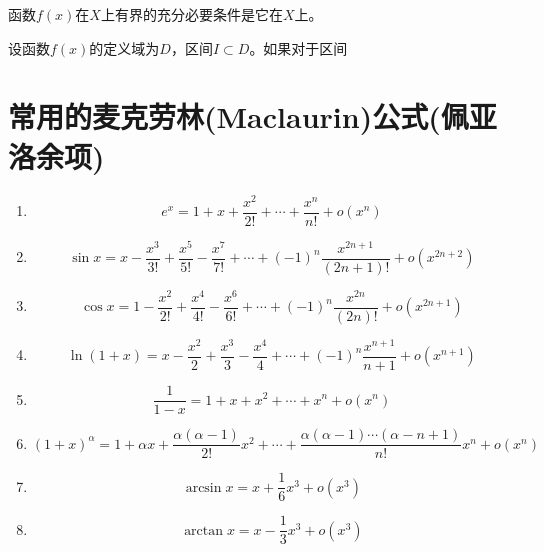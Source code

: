 \documentclass[lang=cn,10pt]{elegantbook}
\begin{document}
\begin{note}
	函数\( f(x) \)在\( X \)上有界的{\heiti 充分必要条件}是它在\( X \)上。
\end{note}

\begin{definition}[函数的单调性]
	设函数\( f(x) \)的定义域为\( D \)，区间\( I \subset D \)。如果对于区间
\end{definition}

\appendix
\renewcommand{\thechapter}{\Roman{chapter}}%
\chapter{常用的麦克劳林(Maclaurin)公式(佩亚洛余项)}
\begin{enumerate}
	\item \[ e^{x} = 1 + x + \dfrac{x^{2}}{2!} + \cdots + \dfrac{x^{n}}{n!} + o(x^{n}) \]
	\item \[ \sin x = x - \dfrac{x^{3}}{3!} + \dfrac{x^{5}}{5!} - \dfrac{x^{7}}{7!} + \cdots + (-1)^{n}\dfrac{x^{2n + 1}}{(2n + 1)!} + o(x^{2n + 2}) \]
	\item \[ \cos x = 1 - \dfrac{x^{2}}{2!} + \dfrac{x^{4}}{4!} - \dfrac{x^{6}}{6!} + \cdots + (-1)^{n}\dfrac{x^{2n}}{(2n)!} + o(x^{2n + 1}) \]
	\item \[ \ln(1 + x) = x - \dfrac{x^{2}}{2} + \dfrac{x^{3}}{3} - \dfrac{x^{4}}{4} + \cdots + (-1)^{n}\dfrac{x^{n + 1}}{n + 1} + o(x^{n + 1}) \]
	\item \[ \dfrac{1}{1 - x} = 1 + x + x^{2} + \cdots +x^{n} + o(x^{n}) \]
	\item \[ (1 + x)^{\alpha} = 1 + \alpha x + \dfrac{\alpha(\alpha - 1)}{2!}x^{2} + \cdots + \dfrac{\alpha(\alpha - 1)\cdots(\alpha - n + 1)}{n!}x^{n} + o(x^{n}) \]
	\item \[ \arcsin x = x + \dfrac{1}{6}x^{3} + o(x^{3}) \]
	\item \[ \arctan x = x - \dfrac{1}{3}x^{3} + o(x^{3}) \]
\end{enumerate}
\end{document}
